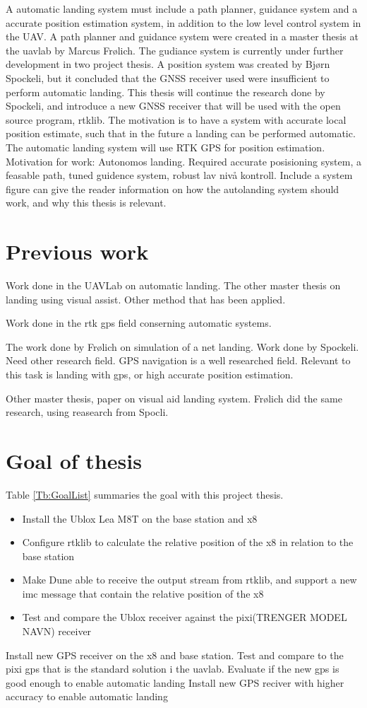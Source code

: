 A automatic landing system must include a path planner, guidance system and a accurate position estimation system, in addition to the low level control system in the UAV. A path planner and guidance system were created in a master thesis at the uavlab by Marcus Frølich. The gudiance system is currently under further development in two project thesis. A position system was created by Bjørn Spockeli, but it concluded that the GNSS receiver used were insufficient to perform automatic landing. This thesis will continue the research done by Spockeli, and introduce a new GNSS receiver that will be used with the open source program, rtklib. The motivation is to have a system with accurate local position estimate, such that in the future a landing can be performed automatic.
The automatic landing system will use RTK GPS for position estimation. 
Motivation for work: Autonomos landing. Required accurate posisioning system, a feasable path, tuned guidence system, robust lav nivå kontroll. Include a system figure can give the reader information on how the autolanding system should work, and why this thesis is relevant.
\section{Previous work}
Work done in the UAVLab on automatic landing. The other master thesis on landing using visual assist. Other method that has been applied. 

Work done in the rtk gps field conserning automatic systems. 

The work done by Frølich on simulation of a net landing. Work done by Spockeli. Need other research field. GPS navigation is a well researched field. Relevant to this task is landing with gps, or high accurate position estimation. 

Other master thesis, paper on visual aid landing system. Frølich did the same research, using reasearch from Spocli.
\section{Goal of thesis}
Table \ref{Tb:GoalList} summaries the goal with this project thesis.
\begin{itemize}\label{Tb:GoalList}
\item Install the Ublox Lea M8T on the base station and x8
\item Configure rtklib to calculate the relative position of the x8 in relation to the base station
\item Make Dune able to receive the output stream from rtklib, and support a new imc message that contain the relative position of the x8
\item Test and compare the Ublox receiver against the pixi(TRENGER MODEL NAVN) receiver
\end{itemize}
Install new GPS receiver on the x8 and base station. Test and compare to the pixi gps that is the standard solution i the uavlab. Evaluate if the new gps is good enough to enable automatic landing
Install new GPS reciver with higher accuracy to enable automatic landing

